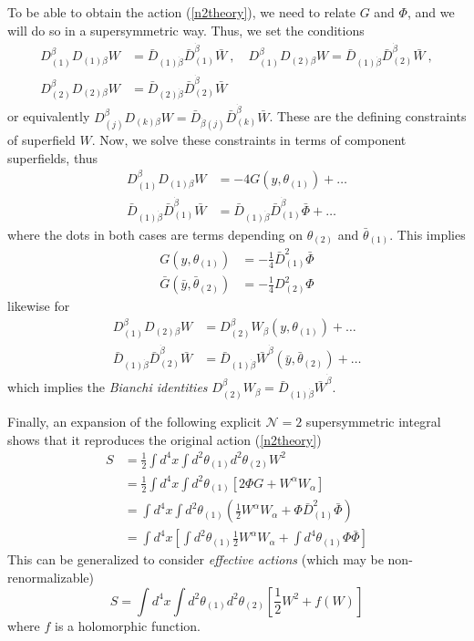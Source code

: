 \documentclass[a4paper,12pt]{article}
\numberwithin{equation}{section}
\numberwithin{exe}{section}
\newcommand{\Db}{{\bar D}}
\newcommand{\yb}{{\bar y}}
\newcommand{\Wb}{{\bar W}}
\renewcommand{\a}{{\alpha}}
\renewcommand{\b}{{\beta}}
\newcommand{\bd}{{\dot\beta}}
\renewcommand{\t}{{\theta}}
\newcommand{\tb}{{\bar\theta}}
\newcommand{\Phib}{{\bar \Phi}}
\begin{document}
To be able to obtain the action (\ref{n2theory}), we need to relate $G$ and $\Phi$, and we will do so in a supersymmetric way. Thus, we set the conditions
	\begin{equation}
		\begin{aligned}
		D^\b_{(1)} D_{(1)\b} W & = \Db_{(1)\bd} \Db^\bd_{(1)} \Wb\ ,\quad D^\b_{(1)}D_{(2)\b} W = \Db_{(1)\bd}\Db^\bd_{(2)}\Wb\ , \\
		D^\b_{(2)} D_{(2)\b} W & = \Db_{(2)\bd} \Db_{(2)}^\bd \Wb
		\end{aligned}
	\end{equation}
or equivalently $D^\b_{(j)} D_{(k)\b} W = \Db_{\bd (j)} \Db^\bd_{(k)} \Wb$. These are the defining constraints of superfield $W$. Now, we solve these constraints in terms of component superfields, thus
	\begin{equation}
		\begin{aligned}
		D^\b_{(1)} D_{(1)\b} W & = -4 G(y,\t_{(1)}) + \ldots \\
		\Db_{(1)\bd} \Db_{(1)}^\bd \Wb & = \Db_{(1)\bd}\Db^\bd_{(1)} \Phib + \ldots
		\end{aligned}
	\end{equation}
where the dots in both cases are terms depending on $\t_{(2)}$ and $\tb_{(1)}$. This implies
	\begin{equation}
		\begin{aligned}
		G(y, \t_{(1)}) & = -\frac14\Db^2_{(1)} \Phib \\
		\bar G(\yb, \tb_{(2)}) & = -\frac14 D^2_{(2)}\Phi
		\end{aligned}
	\end{equation}
likewise for
	\begin{equation}
		\begin{aligned}
		D^\b_{(1)} D_{(2)\b} W & = D^\b_{(2)} W_\b(y,\t_{(1)}) + \ldots \\
		\Db_{(1)\bd} \Db_{(2)}^\bd \Wb & = \Db_{(1)\bd} \Wb^\bd(\yb, \tb_{(2)}) + \ldots
		\end{aligned}
	\end{equation}
which implies the {\it Bianchi identities} $D^\b_{(2)} W_\b = \Db_{(1)\bd} \Wb^\bd$.

Finally, an expansion of the following explicit $\mathcal N=2$ supersymmetric integral shows that it reproduces the original action (\ref{n2theory})
	\begin{align}
	S & = \frac12 \int d^4x \int d^2\t_{(1)} d^2\t_{(2)} W^2 \nonumber \\
	& = \frac12 \int d^4x \int d^2\t_{(1)} \left[ 2\Phi G + W^\a W_\a \right] \nonumber \\
	& = \int d^4x \int d^2\t_{(1)} \left(\frac12 W^\a W_\a + \Phi\Db^2_{(1)} \Phib\right) \nonumber \\
	& = \int d^4x \left[ \int d^2\t_{(1)} \frac12 W^\a W_\a + \int d^4\t_{(1)} \Phi\Phib \right]
	\end{align}
This can be generalized to consider {\it effective actions} (which may be non-renorma\-li\-za\-ble)
	\begin{equation}
	S = \int d^4x \int d^2\t_{(1)} d^2\t_{(2)} \left[ \frac12 W^2 + f(W) \right]
	\end{equation}
where $f$ is a holomorphic function.
\end{document}
